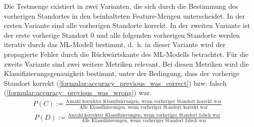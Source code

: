 Die Testmenge existiert in zwei Varianten, die sich durch die Bestimmung des vorherigen Standortes in den beinhalteten Feature-Mengen unterscheidet.
In der ersten Variante sind alle vorherigen Standorte korrekt.
In der zweiten Variante ist der erste vorherige Standort 0 und alle folgenden vorherigen Standorte werden iterativ durch das ML-Modell bestimmt,
d.~h. in dieser Variante wird der propagierte Fehler durch die Rückwärtskante des ML-Modells betrachtet.
\newline
\newline
Für die zweite Variante sind zwei weitere Metriken relevant.
Bei diesen Metriken wird die Klassifizierungsgenauigkeit bestimmt, unter der Bedingung, dass der vorherige
Standort korrekt (\ref{formular:accuracy_previous_was_correct}) bzw. falsch (\ref{formular:accuracy_previous_was_wrong}) war.
\begin{align}
    \label{formular:accuracy_previous_was_correct}
    P(C) := \frac{\text{Anzahl korrekter Klassifizierungen, wenn vorheriger Standort korrekt war}}{\text{Alle Klassifizierungen, wenn vorheriger Standort korrekt war}}
\end{align}
\begin{align}
    \label{formular:accuracy_previous_was_wrong}
    P(D) := \frac{\text{Anzahl korrekter Klassifizierungen, wenn vorheriger Standort falsch war}}{\text{Alle Klassifizierungen, wenn vorheriger Standort falsch war}}
\end{align}

